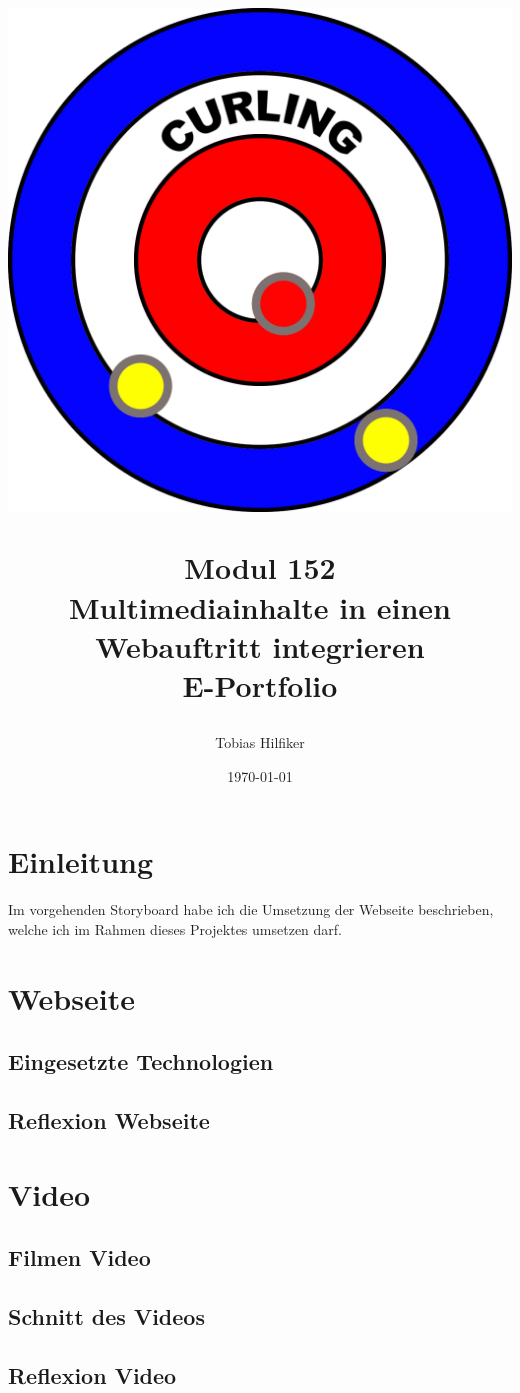 \documentclass[11pt]{article}
\title{
    \includegraphics[width=\textwidth]{media/curling_logo}
    \begin{center}
        Modul 152 \\
        Multimediainhalte in einen Webauftritt integrieren\\
        E-Portfolio
    \end{center}}
\author{Tobias Hilfiker}
\date{\today}
\begin{document}
    \begin{titlingpage}
        \maketitle
    \end{titlingpage}
    \pagebreak

    \tableofcontents
    \pagebreak

    \section{Einleitung}
    Im vorgehenden Storyboard habe ich die Umsetzung der Webseite beschrieben, welche ich im Rahmen dieses Projektes umsetzen darf.

    \section{Webseite}

    \subsection{Eingesetzte Technologien}

    \subsection{Reflexion Webseite}

    \section{Video}

    \subsection{Filmen Video}

    \subsection{Schnitt des Videos}

    \subsection{Reflexion Video}
\end{document}
